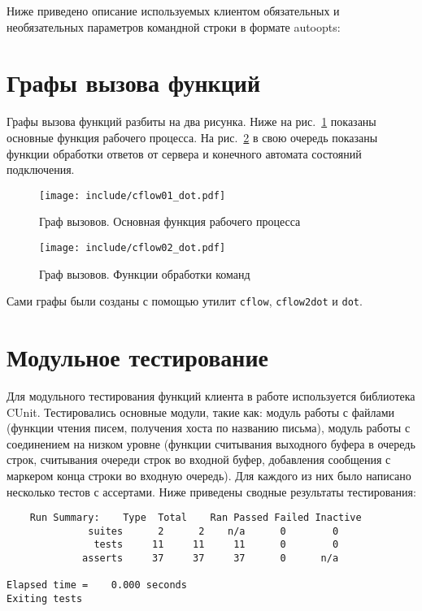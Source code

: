 \documentclass[a4paper,12pt]{report}
\begin{document}
Ниже приведено описание используемых клиентом обязательных и необязательных параметров командной строки в формате autoopts:



\section{Графы вызова функций}

Графы вызова функций разбиты на два рисунка. Ниже на рис.~\ref{fig:cflow1} показаны основные функция рабочего процесса. На рис.~\ref{fig:cflow2} в свою очередь показаны функции обработки ответов от сервера и конечного автомата состояний подключения.

\begin{figure}[h]
\texttt{[image: include/cflow01\_dot.pdf]}
\caption{Граф вызовов. Основная функция рабочего процесса}
\label{fig:cflow1}
\end{figure}

\begin{figure}
\centering
\texttt{[image: include/cflow02\_dot.pdf]}
\caption{Граф вызовов. Функции обработки команд}
\label{fig:cflow2}
\end{figure}

Сами графы были созданы с помощью утилит \texttt{cflow}, \texttt{cflow2dot} и \texttt{dot}.


\section{Модульное тестирование}

Для модульного тестирования функций клиента в работе используется библиотека CUnit. Тестировались основные модули, такие как: модуль работы с файлами (функции чтения писем, получения хоста по названию письма), модуль работы с соединением на низком уровне (функции считывания выходного буфера в очередь строк, считывания очереди строк во входной буфер, добавления сообщения с маркером конца строки во входную очередь). Для каждого из них было написано несколько тестов с ассертами. Ниже приведены сводные результаты тестирования:
\begin{verbatim}
    Run Summary:    Type  Total    Ran Passed Failed Inactive
              suites      2      2    n/a      0        0
               tests     11     11     11      0        0
             asserts     37     37     37      0      n/a

Elapsed time =    0.000 seconds
Exiting tests
\end{verbatim}
\end{document}
